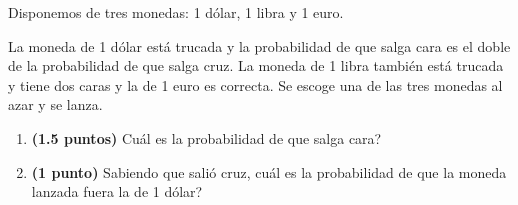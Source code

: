 
Disponemos de tres monedas: 1 dólar, 1 libra y 1 euro.

La moneda de 1 dólar está trucada y la probabilidad de que salga cara es el doble de la probabilidad de que salga cruz. La moneda de 1 libra también está trucada y tiene dos caras y la de 1 euro es correcta. Se escoge una de las tres monedas al azar y se lanza.
\begin{enumerate}[label=\alph*)]
\item \textbf{(1.5 puntos)} \textquestiondown{}Cuál es la probabilidad de que salga cara?
\item \textbf{(1 punto)} Sabiendo que salió cruz, \textquestiondown{}cuál es la probabilidad de que la moneda lanzada fuera la de 1 dólar?
\end{enumerate}

